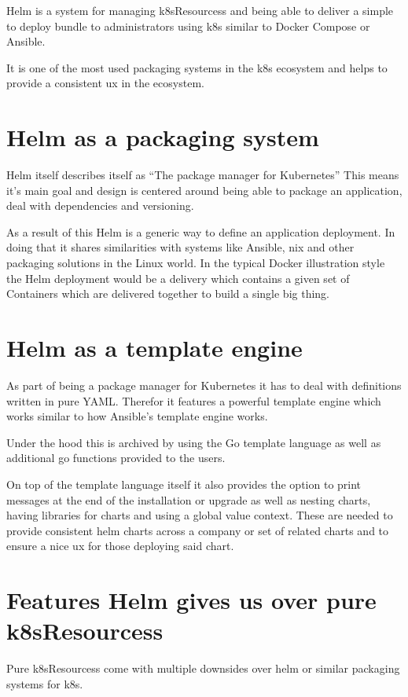 Helm is a system for managing \Glspl{k8sResources} and being able to deliver a simple to deploy bundle to administrators using \Gls{k8s} similar to Docker Compose or Ansible.

It is one of the most used packaging systems in the \Gls{k8s} ecosystem and helps to provide a consistent \gls{ux} in the ecosystem.

\section{Helm as a packaging system}
Helm itself describes itself as \enquote{The package manager for Kubernetes}\cite{helmauthorsHelm}
This means it's main goal and design is centered around being able to package an application, deal with dependencies and versioning.

As a result of this Helm is a generic way to define an application deployment.
In doing that it shares similarities with systems like Ansible, nix and other packaging solutions in the Linux world. 
In the typical Docker illustration style the Helm deployment would be a delivery which contains a given set of Containers which are delivered together to build a single big thing.

\section{Helm as a template engine}
As part of being a package manager for Kubernetes it has to deal with definitions written in pure YAML.
Therefor it features a powerful template engine which works similar to how Ansible's template engine works.

Under the hood this is archived by using the Go template language\cite{helmauthorsTemplateFunctionsPipelines,thegoauthorsTemplatePackageText} as well as additional go functions provided to the users.

On top of the template language itself it also provides the option to print messages at the end of the installation or upgrade as  well as nesting charts, having libraries for charts and using a global value context.
These are needed to provide consistent helm charts across a company or set of related charts and to ensure a nice \gls{ux} for those deploying said chart.

\section{Features Helm gives us over pure \Glspl{k8sResources}}
Pure \Glspl{k8sResources} come with multiple downsides over helm or similar packaging systems for \Gls{k8s}.


